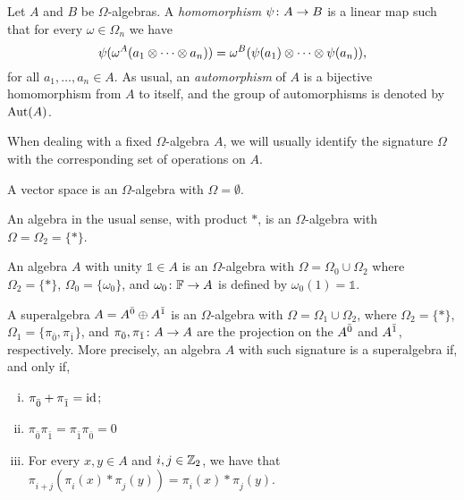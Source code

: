 \begin{defi}
	Let $A$ and $B$ be $\Omega$-algebras.
	A \emph{homomorphism} $\psi\colon A \to B$ is a linear map such that for every $\omega \in \Omega_n$ we have
	\[
		\psi( \omega^A (a_1 \otimes \cdots \otimes a_n) ) = \omega^B ( \psi(a_1) \otimes \cdots \otimes \psi(a_n) ),
	\]
	for all $a_1, \ldots, a_n \in A$.
	As usual, an \emph{automorphism} of $A$ is a bijective homomorphism from $A$ to itself, and the group of automorphisms is denoted by $\operatorname{Aut}(A)$.
\end{defi}

When dealing with a fixed $\Omega$-algebra $A$, we will usually identify the signature $\Omega$ with the corresponding set of operations on $A$.

\begin{ex}\label{ex:omega-vec-space}
	A vector space is an $\Omega$-algebra with $\Omega = \emptyset$.
\end{ex}

\begin{ex}\label{ex:omega-algebra}
	An algebra in the usual sense, with product $*$, is an $\Omega$-algebra with $\Omega = \Omega_2 = \{ * \}$.
\end{ex}

\begin{ex}
	An algebra $A$ with unity $\mathds{1} \in A$ is an  $\Omega$-algebra with $\Omega = \Omega_0 \cup \Omega_2$ where $\Omega_2 = \{ * \}$, $\Omega_0 = \{ \omega_0 \}$, and $\omega_0\colon \mathbb{F} \to A$ is defined by $\omega_0 (1) = \mathds 1$.
\end{ex}

\begin{ex}\label{ex:omega-alg-SA}
	A superalgebra $A = A^{\bar0} \oplus A^{\bar1}$ is an $\Omega$-algebra with $\Omega = \Omega_1 \cup \Omega_2$, where $\Omega_2 = \{ * \}$, $\Omega_1 = \{ \pi_{\bar 0}, \pi_{\bar 1} \}$, and $\pi_{\bar 0}, \pi_{\bar 1}\colon A \to A$ are the projection on the $A^{\bar0}$ and $A^{\bar1}$, respectively.
	More precisely, an algebra $A$ with such signature is a superalgebra if, and only if,
	\begin{enumerate}[(i)]
		\item $\pi_{\bar 0}^{} + \pi_{\bar 1}^{} = \operatorname{id}$; \label{item:sum-projections}
		\item $\pi_{\bar 0}^{}\pi_{\bar 1}^{} = \pi_{\bar 1}^{}\pi_{\bar 0}^{} = 0$
		\item For every $x,y \in A$ and $i, j\in \mathbb{Z}_2$, we have that $\pi_{i+j}^{}( \pi_i^{} (x)*\pi_j^{} (y) ) = \pi_i^{} (x)*\pi_j^{} (y)$.
	\end{enumerate}
\end{ex}


